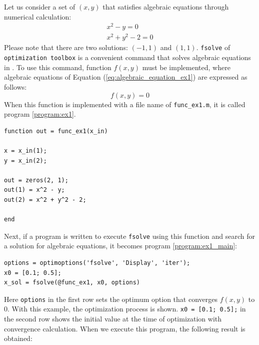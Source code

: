 \documentclass[tombow,dvipdfmx]{corona-a5-1.1}
\begin{document}
\begin{例}\label{ex:algenraic_equation_ex1}
Let us consider a set of $(x, y)$ that satisfies algebraic equations through numerical calculation: 
\begin{subequations}\label{eq:algebraic_equation_ex1}
\begin{align}
x^2 - y = 0\\
x^2 + y^2 - 2 = 0
\end{align}
\end{subequations}
Please note that there are two solutions: $(-1, 1)$ and $(1, 1)$. \verb|fsolve| of \verb|optimization toolbox| is a convenient command that solves algebraic equations in \matlab.
To use this command, function $f(x,y)$ must be implemented, where algebraic equations of Equation (\ref{eq:algebraic_equation_ex1}) are expressed as follows:
\[
f(x,y)=0
\]
When this function is implemented with a file name of \verb|func_ex1.m|, it is called program \nobreak\ref{program:ex1}.

\smallskip
\begin{PROGRAMA}[count,title={func\_ex1.m}]\label{program:ex1}
\begin{verbatim}
function out = func_ex1(x_in)

x = x_in(1);
y = x_in(2);

out = zeros(2, 1);
out(1) = x^2 - y;
out(2) = x^2 + y^2 - 2;

end
\end{verbatim}
\end{PROGRAMA}

Next, if a program is written to execute \verb|fsolve| using this function and search for a solution for algebraic equations, it becomes program \nobreak\ref{program:ex1_main}:
\smallskip
\begin{PROGRAMA}[count,title={main\_ex1.m}]\label{program:ex1_main}
\begin{verbatim}
options = optimoptions('fsolve', 'Display', 'iter');
x0 = [0.1; 0.5];
x_sol = fsolve(@func_ex1, x0, options)
\end{verbatim}
\end{PROGRAMA}

Here \verb|options| in the first row sets the optimum option that converges $f(x,y)$ to 0.
With this example, the optimization process is shown. \verb|x0 = [0.1; 0.5];| in the second row shows the initial value at the time of optimization with convergence calculation.
When we execute this program, the following result is obtained:


\end{例}
\end{document}
